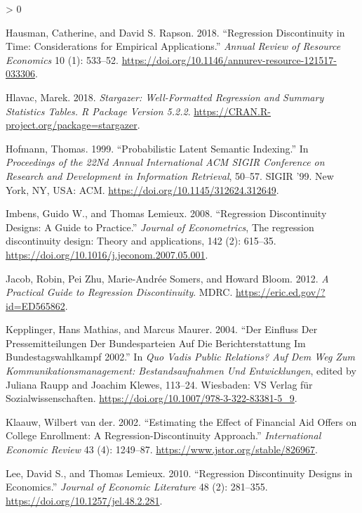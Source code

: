 \documentclass[
]{article}
\newlength{\cslhangindent}
\newenvironment{CSLReferences}[2] %
 {%
  \setlength{\parindent}{0pt}
  \ifodd #1 \everypar{\setlength{\hangindent}{\cslhangindent}}\ignorespaces\fi
  \ifnum #2 > 0
  \setlength{\parskip}{#2\baselineskip}
  \fi
 }%
 {}
\begin{document}
\begin{CSLReferences}{1}{0}
\leavevmode\hypertarget{ref-hausman_regression_2018}{}%
Hausman, Catherine, and David S. Rapson. 2018. {``Regression
Discontinuity in Time: Considerations for Empirical Applications.''}
\emph{Annual Review of Resource Economics} 10 (1): 533--52.
\url{https://doi.org/10.1146/annurev-resource-121517-033306}.

\leavevmode\hypertarget{ref-hlavac_stargazer_2018}{}%
Hlavac, Marek. 2018. \emph{Stargazer: Well-Formatted Regression and
Summary Statistics Tables. R Package Version 5.2.2}.
\url{https://CRAN.R-project.org/package=stargazer}.

\leavevmode\hypertarget{ref-hofmann_probabilistic_1999}{}%
Hofmann, Thomas. 1999. {``Probabilistic Latent Semantic Indexing.''} In
\emph{Proceedings of the 22Nd Annual International {ACM} {SIGIR}
Conference on Research and Development in Information Retrieval},
50--57. {SIGIR} '99. New York, {NY}, {USA}: {ACM}.
\url{https://doi.org/10.1145/312624.312649}.

\leavevmode\hypertarget{ref-imbens_regression_2008}{}%
Imbens, Guido W., and Thomas Lemieux. 2008. {``Regression Discontinuity
Designs: A Guide to Practice.''} \emph{Journal of Econometrics}, The
regression discontinuity design: Theory and applications, 142 (2):
615--35. \url{https://doi.org/10.1016/j.jeconom.2007.05.001}.

\leavevmode\hypertarget{ref-jacob_practical_2012}{}%
Jacob, Robin, Pei Zhu, Marie-Andrée Somers, and Howard Bloom. 2012.
\emph{A Practical Guide to Regression Discontinuity}. {MDRC}.
\url{https://eric.ed.gov/?id=ED565862}.

\leavevmode\hypertarget{ref-kepplinger_einfluss_2004}{}%
Kepplinger, Hans Mathias, and Marcus Maurer. 2004. {``Der Einfluss Der
Pressemitteilungen Der Bundesparteien Auf Die Berichterstattung Im
Bundestagswahlkampf 2002.''} In \emph{Quo Vadis Public Relations? Auf
Dem Weg Zum Kommunikationsmanagement: Bestandsaufnahmen Und
Entwicklungen}, edited by Juliana Raupp and Joachim Klewes, 113--24.
Wiesbaden: {VS} Verlag für Sozialwissenschaften.
\url{https://doi.org/10.1007/978-3-322-83381-5_9}.

\leavevmode\hypertarget{ref-van_der_klaauw_estimating_2002}{}%
Klaauw, Wilbert van der. 2002. {``Estimating the Effect of Financial Aid
Offers on College Enrollment: A Regression-Discontinuity Approach.''}
\emph{International Economic Review} 43 (4): 1249--87.
\url{https://www.jstor.org/stable/826967}.

\leavevmode\hypertarget{ref-lee_regression_2010}{}%
Lee, David S., and Thomas Lemieux. 2010. {``Regression Discontinuity
Designs in Economics.''} \emph{Journal of Economic Literature} 48 (2):
281--355. \url{https://doi.org/10.1257/jel.48.2.281}.


\end{CSLReferences}
\end{document}
